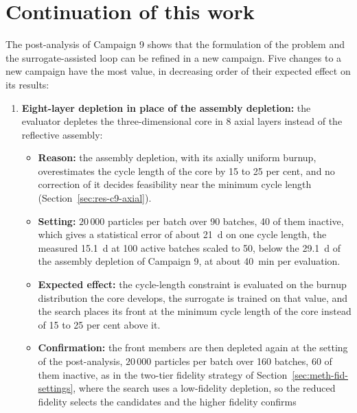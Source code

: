 \section{Continuation of this work}
\label{sec:concl-future}

The post-analysis of Campaign 9 shows that the formulation of the
problem and the surrogate-assisted loop can be refined in a new
campaign. Five changes to a new campaign have the most value, in decreasing order of their expected
effect on its results:

\begin{enumerate}
    \item \textbf{Eight-layer depletion in place of the assembly
        depletion:} the evaluator depletes the three-dimensional core in
        8 axial layers instead of the reflective assembly:
        \begin{itemize}
          \item \textbf{Reason:} the assembly depletion, with its
                axially uniform burnup, overestimates the cycle length
                of the core by 15 to 25 per cent, and no correction of
                it decides feasibility near the minimum cycle length
                (Section~\ref{sec:res-c9-axial}).
          \item \textbf{Setting:} $20\,000$ particles per batch over 90
                batches, 40 of them inactive, which gives a statistical
                error of about \SI{21}{d} on one cycle length, the
                measured \SI{15.1}{d} at 100 active batches scaled to
                50, below the \SI{29.1}{d} of the assembly depletion of
                Campaign 9, at about \SI{40}{min} per evaluation.
          \item \textbf{Expected effect:} the cycle-length constraint is
                evaluated on the burnup distribution the core develops,
                the surrogate is trained on that value, and the search
                places its front at the minimum cycle length of the core
                instead of 15 to 25 per cent above it.
          \item \textbf{Confirmation:} the front members are then
                depleted again at the setting of the post-analysis,
                $20\,000$ particles per batch over 160 batches, 60 of
                them inactive, as in the two-tier fidelity strategy of
                Section~\ref{sec:meth-fid-settings}, where the search
                uses a low-fidelity depletion, so the reduced fidelity
                selects the candidates and the higher fidelity confirms

\end{itemize}
\end{enumerate}

